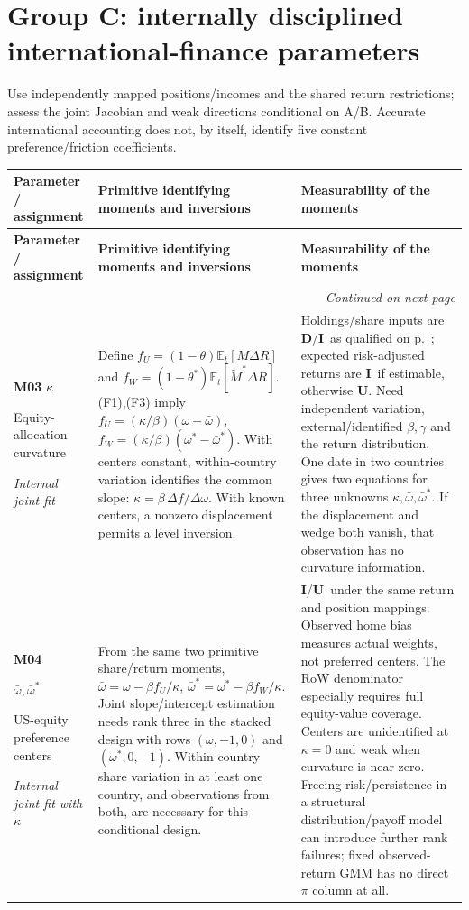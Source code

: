 \documentclass[10pt,a4paper,landscape]{article}
\makeatletter
\newcommand{\E}{\mathbb E_t}
\newcommand{\direct}{\textbf{D}}
\newcommand{\indirect}{\textbf{I}}
\newcommand{\unavail}{\textbf{U}}
\newcommand{\route}[1]{\par\textit{#1}}
\newenvironment{momenttable}{%
\fontsize{9.5}{11.2}\selectfont\setlength{\parskip}{3pt}
\begin{longtable}{@{}P{\dimexpr .16\textwidth-6.67pt\relax}P{\dimexpr .49\textwidth-6.67pt\relax}P{\dimexpr .35\textwidth-6.66pt\relax}@{}}
\toprule\rowcolor{tablehead}\textbf{Parameter / assignment} & \textbf{Primitive identifying moments and inversions} & \textbf{Measurability of the moments}\\\midrule
\endfirsthead
\toprule\rowcolor{tablehead}\textbf{Parameter / assignment} & \textbf{Primitive identifying moments and inversions} & \textbf{Measurability of the moments}\\\midrule
\endhead
\midrule\multicolumn{3}{r}{\footnotesize\itshape Continued on next page}\\\endfoot
\bottomrule\endlastfoot
}{\end{longtable}}
\makeatother
\begin{document}
\clearpage
\section{Group C: internally disciplined international-finance parameters}
Use independently mapped positions/incomes and the shared return restrictions; assess the joint Jacobian and weak directions conditional on A/B. Accurate international accounting does not, by itself, identify five constant preference/friction coefficients.
\begin{momenttable}
\textbf{M03} $\kappa$\par Equity-allocation curvature\route{Internal joint fit}
& Define $f_U=(1-\theta)\E[M\Delta R]$ and $f_W=(1-\theta^*)\E[\widetilde M^*\Delta R]$. (F1),(F3) imply
\(f_U=(\kappa/\beta)(\omega-\bar\omega)\),
\(f_W=(\kappa/\beta)(\omega^*-\bar\omega^*)\).
With centers constant, within-country variation identifies the common slope: $\kappa=\beta\,\Delta f/\Delta\omega$. With known centers, a nonzero displacement permits a level inversion.
& Holdings/share inputs are \direct/\indirect\ as qualified on p.~\pageref{sec:financial}; expected risk-adjusted returns are \indirect\ if estimable, otherwise \unavail. Need independent variation, external/identified $\beta,\gamma$ and the return distribution. One date in two countries gives two equations for three unknowns $\kappa,\bar\omega,\bar\omega^*$. If the displacement and wedge both vanish, that observation has no curvature information.\\[5pt]
\textbf{M04}\par $\bar\omega,\bar\omega^*$\par US-equity preference centers\route{Internal joint fit with $\kappa$}
& From the same two primitive share/return moments,
\(\bar\omega=\omega-\beta f_U/\kappa\),
\(\bar\omega^*=\omega^*-\beta f_W/\kappa\).
Joint slope/intercept estimation needs rank three in the stacked design with rows $(\omega,-1,0)$ and $(\omega^*,0,-1)$. Within-country share variation in at least one country, and observations from both, are necessary for this conditional design.
& \indirect/\unavail\ under the same return and position mappings. Observed home bias measures actual weights, not preferred centers. The RoW denominator especially requires full equity-value coverage. Centers are unidentified at $\kappa=0$ and weak when curvature is near zero. Freeing risk/persistence in a structural distribution/payoff model can introduce further rank failures; fixed observed-return GMM has no direct $\pi$ column at all.\\[5pt]

\end{momenttable}
\end{document}
